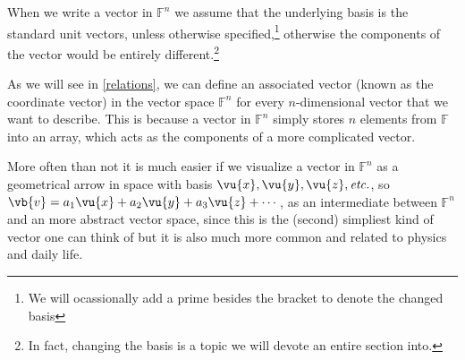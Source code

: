 \documentclass[a4paper,12pt]{report}
\begin{document}
When we write a vector in \(\mathbb{F}^{n} \) we assume that the underlying basis is the standard unit vectors, unless otherwise specified,\footnote{We will ocassionally add a prime besides the bracket to denote the changed basis} otherwise the components of the vector would be entirely different.\footnote{In fact, changing the basis is a topic we will devote an entire section into.} 

As we will see in \cref{relations}, we can define an associated vector (known as the coordinate vector) in the vector space \(\mathbb{F}^{n} \) for every \(n\)-dimensional vector that we want to describe. This is because a vector in \(\mathbb{F}^{n} \) simply stores \(n\) elements from \(\mathbb{F}\) into an array, which acts as the components of a more complicated vector. 

More often than not it is much easier if we visualize a vector in \(\mathbb{F}^{n} \) as a geometrical arrow in space with basis \(\vu{x} , \vu{y}, \vu{z} , \textit{etc.} \), so \(\vb{v} = a_1 \vu{x} + a_2 \vu{y} + a_3 \vu{z} + \cdots  \), as an intermediate between \(\mathbb{F}^{n}\) and an more abstract vector space, since this is the (second) simpliest kind of vector one can think of but it is also much more common and related to physics and daily life.  
\end{document}
